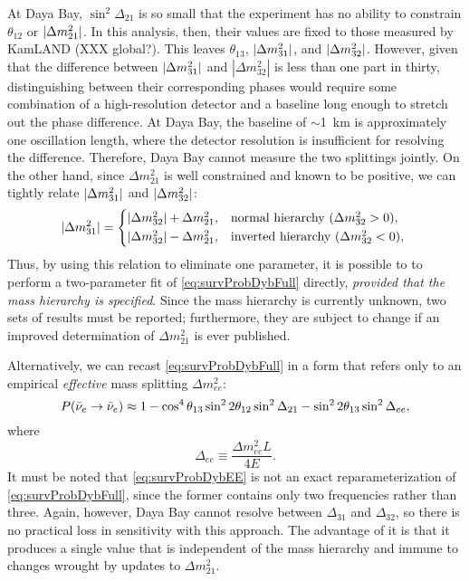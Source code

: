 \documentclass[../thesis.tex]{subfiles}
\begin{document}
At Daya Bay, \(\sin^2 \Delta_{21}\) is so small that the experiment has no
ability to constrain $\theta_{12}$ or \(\lvert \Delta m^2_{21}\rvert\). In this
analysis, then, their values are fixed to those measured by KamLAND (XXX
global?). This leaves $\theta_{13}$, \(\lvert \Delta m^2_{31}\rvert\), and
\(\lvert \Delta m^2_{32}\rvert\). However, given that the difference between
\(\lvert \Delta m^2_{31}\rvert\) and \(|\Delta m^2_{32}|\) is less than one part in
thirty, distinguishing between their corresponding phases would require some
combination of a high-resolution detector and a baseline long enough to stretch
out the phase difference. At Daya Bay, the baseline of $\sim$1~km is
approximately one oscillation length, where the detector resolution is
insufficient for resolving the difference. Therefore, Daya Bay cannot measure
the two splittings jointly. On the other hand, since \(\Delta m^2_{21}\) is well
constrained and known to be positive, we can tightly relate \(\lvert \Delta
  m^2_{31}\rvert\) and \(\lvert \Delta m^2_{32}\rvert\):
\begin{equation*}
  \label{eq:hierarchy}
  \abs{\Delta m^2_{31}} =
  \begin{cases*}
    \abs{\Delta m^2_{32}} + \Delta m^2_{21}, & normal hierarchy ($\Delta m^2_{32} > 0$), \\
    \abs{\Delta m^2_{32}} - \Delta m^2_{21}, & inverted hierarchy ($\Delta m^2_{32} < 0$), \\
  \end{cases*}
\end{equation*}
Thus, by using this relation to eliminate one parameter, it is possible to to
perform a two-parameter fit of \eqref{eq:survProbDybFull} directly,
\emph{provided that the mass hierarchy is specified}. Since the mass hierarchy
is currently unknown, two sets of results must be reported; furthermore, they
are subject to change if an improved determination of \(\Delta m^2_{21}\) is
ever published.

Alternatively, we can recast \eqref{eq:survProbDybFull} in a form that refers
only to an empirical \emph{effective} mass splitting \(\Delta m^2_{ee}\):
\begin{equation}
  \label{eq:survProbDybEE}
  P(\bar\nu_e \rightarrow \bar\nu_e) \approx 1 - \cos^4\theta_{13}\sin^2 2\theta_{12} \sin^2 \Delta_{21}
  - \sin^2 2\theta_{13}\sin^2\Delta_{ee},
\end{equation}
where
\begin{equation*}
  \Delta_{ee} \equiv \frac{\Delta m^2_{ee}L}{4E}. 
\end{equation*}
It must be noted that \eqref{eq:survProbDybEE} is not an exact
reparameterization of \eqref{eq:survProbDybFull}, since the former contains only
two frequencies rather than three. Again, however, Daya Bay cannot resolve
between $\Delta_{31}$ and $\Delta_{32}$, so there is no practical loss in
sensitivity with this approach. The advantage of it is that it produces a single
value that is independent of the mass hierarchy and immune to changes wrought by
updates to \(\Delta m^2_{21}\).
\end{document}
